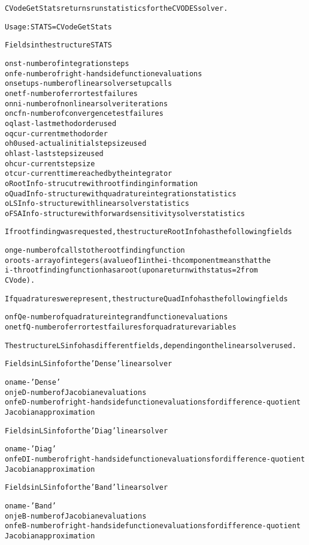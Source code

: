 \begin{alltt}
CVodeGetStats returns run statistics for the CVODES solver.

   Usage: STATS = CVodeGetStats

Fields in the structure STATS

o nst      - number of integration steps
o nfe      - number of right-hand side function evaluations
o nsetups  - number of linear solver setup calls
o netf     - number of error test failures
o nni      - number of nonlinear solver iterations
o ncfn     - number of convergence test failures
o qlast    - last method order used
o qcur     - current method order
o h0used   - actual initial step size used
o hlast    - last step size used
o hcur     - current step size
o tcur     - current time reached by the integrator
o RootInfo - strucutre with rootfinding information
o QuadInfo - structure with quadrature integration statistics
o LSInfo   - structure with linear solver statistics
o FSAInfo  - structure with forward sensitivity solver statistics

If rootfinding was requested, the structure RootInfo has the following fields

o nge   - number of calls to the rootfinding function
o roots - array of integers (a value of 1 in the i-th component means that the
          i-th rootfinding function has a root (upon a return with status=2 from
          CVode).

If quadratures were present, the structure QuadInfo has the following fields

o nfQe  - number of quadrature integrand function evaluations
o netfQ - number of error test failures for quadrature variables

The structure LSinfo has different fields, depending on the linear solver used.

  Fields in LSinfo for the 'Dense' linear solver

o name - 'Dense'
o njeD - number of Jacobian evaluations
o nfeD - number of right-hand side function evaluations for difference-quotient
         Jacobian approximation

  Fields in LSinfo for the 'Diag' linear solver

o name  - 'Diag'
o nfeDI - number of right-hand side function evaluations for difference-quotient
          Jacobian approximation

  Fields in LSinfo for the 'Band' linear solver

o name - 'Band'
o njeB - number of Jacobian evaluations
o nfeB - number of right-hand side function evaluations for difference-quotient
         Jacobian approximation


\end{alltt}
